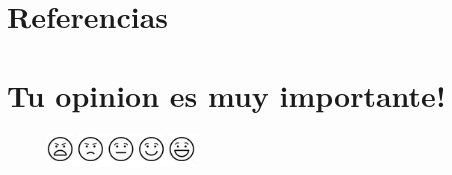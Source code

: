 \documentclass[12pt,letterpaper]{article}
\begin{document}
\section{Referencias\label{sec:references}}

\printbibliography[heading=none]

\section{Tu opinion es muy importante!}
\begin{figure}
    \centering
    \includegraphics[width=4cm]{./images/vote.png}
    \captionsetup{justification=centering, singlelinecheck=false}
\end{figure}
\end{document}
